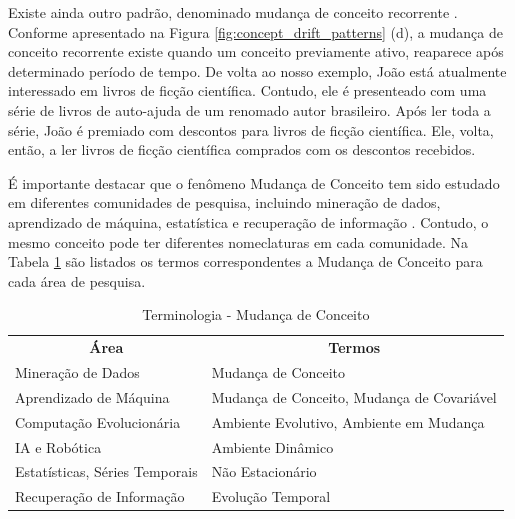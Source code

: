 \documentclass[qual, classic, a4paper]{ufbathesis}
\begin{document}
Existe ainda outro padrão, denominado mudança de conceito recorrente \cite{Zliobaite:2010}. 
Conforme apresentado na Figura \ref{fig:concept_drift_patterns} (d), a mudança de conceito recorrente existe quando um conceito previamente ativo, 
reaparece após determinado período de tempo.
De volta ao nosso exemplo, João está atualmente interessado em livros de ficção científica.
Contudo, ele é presenteado com uma série de livros de auto-ajuda de um renomado autor brasileiro.
Após ler toda a série, João é premiado com descontos para livros de ficção científica.
Ele, volta, então, a ler livros de ficção científica comprados com os descontos recebidos.

É importante destacar que o fenômeno Mudança de Conceito tem sido estudado em diferentes comunidades de pesquisa, incluindo mineração de dados, 
aprendizado de máquina, estatística e recuperação de informação \cite{Zliobaite:2010}.
Contudo, o mesmo conceito pode ter diferentes nomeclaturas em cada comunidade.
Na Tabela \ref{tbl:taxonomy} são listados os termos correspondentes a Mudança de Conceito para cada área de pesquisa.

\begin{center} 
\begin{table}[!ht]
\label{tbl:taxonomy}
\begin{tabularx}{\textwidth}{|l|X|}
\cline{1-2}
\multicolumn{1}{|c|}{\textbf{Área}} & \multicolumn{1}{c|}{\textbf{Termos}}       \\ \cline{1-2}
Mineração de Dados                  & Mudança de Conceito                        \\ \cline{1-2}
Aprendizado de Máquina              & Mudança de Conceito, Mudança de Covariável \\ \cline{1-2}
Computação Evolucionária            & Ambiente Evolutivo, Ambiente em Mudança    \\ \cline{1-2}
IA e Robótica                       & Ambiente Dinâmico                          \\ \cline{1-2}
Estatísticas, Séries Temporais      & Não Estacionário                           \\ \cline{1-2}
Recuperação de Informação           & Evolução Temporal                          \\ \cline{1-2}
\end{tabularx}
\caption{Terminologia - Mudança de Conceito \cite{Zliobaite:2010}}
\end{table}
\end{center}
\end{document}
